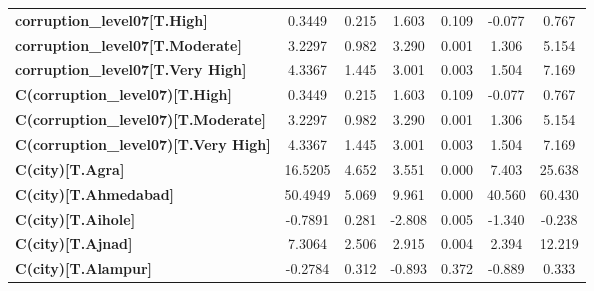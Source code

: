 \begin{center}
\begin{tabular}{lcccccc}
\textbf{corruption\_level07[T.High]}                                                                &       0.3449  &        0.215     &     1.603  &         0.109        &       -0.077    &        0.767     \\
\textbf{corruption\_level07[T.Moderate]}                                                            &       3.2297  &        0.982     &     3.290  &         0.001        &        1.306    &        5.154     \\
\textbf{corruption\_level07[T.Very High]}                                                           &       4.3367  &        1.445     &     3.001  &         0.003        &        1.504    &        7.169     \\
\textbf{C(corruption\_level07)[T.High]}                                                             &       0.3449  &        0.215     &     1.603  &         0.109        &       -0.077    &        0.767     \\
\textbf{C(corruption\_level07)[T.Moderate]}                                                         &       3.2297  &        0.982     &     3.290  &         0.001        &        1.306    &        5.154     \\
\textbf{C(corruption\_level07)[T.Very High]}                                                        &       4.3367  &        1.445     &     3.001  &         0.003        &        1.504    &        7.169     \\
\textbf{C(city)[T.Agra]}                                                                            &      16.5205  &        4.652     &     3.551  &         0.000        &        7.403    &       25.638     \\
\textbf{C(city)[T.Ahmedabad]}                                                                       &      50.4949  &        5.069     &     9.961  &         0.000        &       40.560    &       60.430     \\
\textbf{C(city)[T.Aihole]}                                                                          &      -0.7891  &        0.281     &    -2.808  &         0.005        &       -1.340    &       -0.238     \\
\textbf{C(city)[T.Ajnad]}                                                                           &       7.3064  &        2.506     &     2.915  &         0.004        &        2.394    &       12.219     \\
\textbf{C(city)[T.Alampur]}                                                                         &      -0.2784  &        0.312     &    -0.893  &         0.372        &       -0.889    &        0.333     \\

\end{tabular}
\end{center}
